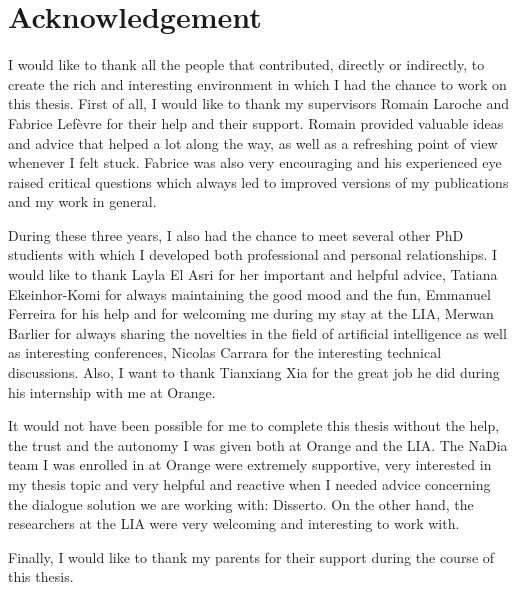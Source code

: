 \chapter*{Acknowledgement}

        I would like to thank all the people that contributed, directly or indirectly, to create the rich and interesting environment in which I had the chance to work on this thesis. First of all, I would like to thank my supervisors Romain Laroche and Fabrice Lef\`evre for their help and their support. Romain provided valuable ideas and advice that helped a lot along the way, as well as a refreshing point of view whenever I felt stuck. Fabrice was also very encouraging and his experienced eye raised critical questions which always led to improved versions of my publications and my work in general.

        During these three years, I also had the chance to meet several other PhD studients with which I developed both professional and personal relationships. I would like to thank Layla El Asri for her important and helpful advice, Tatiana Ekeinhor-Komi for always maintaining the good mood and the fun, Emmanuel Ferreira for his help and for welcoming me during my stay at the LIA, Merwan Barlier for always sharing the novelties in the field of artificial intelligence as well as interesting conferences, Nicolas Carrara for the interesting technical discussions. Also, I want to thank Tianxiang Xia for the great job he did during his internship with me at Orange.

        It would not have been possible for me to complete this thesis without the help, the trust and the autonomy I was given both at Orange and the LIA. The NaDia team I was enrolled in at Orange were extremely supportive, very interested in my thesis topic and very helpful and reactive when I needed advice concerning the dialogue solution we are working with: Disserto. On the other hand, the researchers at the LIA were very welcoming and interesting to work with.

        Finally, I would like to thank my parents for their support during the course of this thesis.

        
